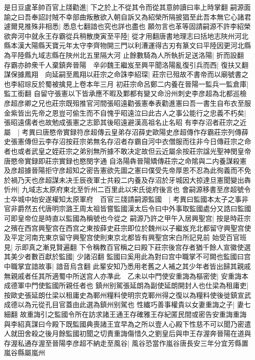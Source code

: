 是日豆盧革帥百官上牋勸進|{
	下之於上不從其令而從其意帥讀曰率上時掌翻}
嗣源面諭之曰吾奉詔討賊不幸部曲叛散欲入朝自訴又為紹榮所隔披猖至此吾本無它心諸君遽爾見推殊非相悉|{
	悉息七翻諳也究也詳也盡也}
願勿言也革等固請嗣源不許李紹榮欲奔河中就永王存霸從兵稍散庚寅至平陸|{
	從才用翻唐書地理志曰括地志陜州河北縣本漢大陽縣天寶元年太守李齊物開三門以利漕運得古刃有篆文曰平陸因更河北縣為平陸縣九域志縣在陜州北五里隔大河}
止餘數騎為人所執折足送洛陽|{
	折而設翻}
存霸亦帥衆千人棄鎮奔晉陽　辛卯魏王繼岌至興平聞洛陽亂復引兵而西|{
	復扶又翻}
謀保據鳳翔　向延嗣至鳳翔以莊宗之命誅李紹琛|{
	莊宗已殂故不書帝而以廟號書之也李紹琮反於蜀被擒見上卷本年三月}
初莊宗命呂鄭二内養在晉陽一監兵一監倉庫|{
	監工銜翻}
自留守張憲以下皆承應不暇及鄴都有變又命汾州刺史李彦超為北都巡檢彦超彦卿之兄也莊宗既殂推官河間張昭遠勸張憲奉表勸進憲曰吾一書生自布衣至服金紫皆出先帝之恩豈可偷生而不自愧乎昭遠泣曰此古人之事公能行之忠義不朽矣|{
	張昭遠儒者也故勉成張憲之志節其後昭遠避漢高祖名止名昭}
有李存沼者莊宗之近屬　|{
	考異曰唐愍帝實録符彦超傳云皇弟存沼薛史歐陽史彦超傳作存霸莊宗列傳薛史張憲傳但云李存沼按莊宗弟無名存沼者存霸自河中衣僧服而往非今日傳莊宗之命者也或者武皇之姪莊宗之弟别無所據不敢决定故但云近屬余按莊宗諡光聖神閔皇帝唐愍帝實録即莊宗實録也愍閔字通}
自洛陽犇晉陽矯傳莊宗之命隂與二内養謀殺憲及彦超據晉陽拒守彦超知之密告憲欲先圖之憲曰僕受先帝厚恩不忍為此徇義而不免於禍乃天也彦超謀未决壬辰夜軍士共殺二内養及存沼於牙城因大掠達旦憲聞變出犇忻州|{
	九域志太原府東北至忻州二百里此以宋氏徙府後言也}
會嗣源移書至彦超號令士卒城中始安遂權知太原軍府　百官三牋請嗣源監國　|{
	考異曰監國本太子之事非官非爵然五代唐明宗潞王周太祖皆嘗監國漢太后令曰中外事取監國處分又誥曰監國可即皇帝位是時直以監國為稱號也今從之}
嗣源乃許之甲午入居興聖宫|{
	按是時莊宗之殯在西宫興聖宫在西宫之東按薛史莊宗即位於魏州以子繼岌充北都留守興聖宫使及平定河南充東京留守興聖宫使則東京北都皆有興聖宫宋白所記見前}
始受百官班見|{
	示即真之漸見賢遍翻}
下令稱教百官稱之曰殿下莊宗後宫存者猶千餘人宣徽使選其美少者數百獻於監國|{
	少諸沼翻}
監國曰奚用此為對曰宫中職掌不可闕也監國曰宫中職掌宜諳故事|{
	諳音烏含翻}
此輩安知乃悉用老舊之人補之其少年者皆出歸其親戚無親戚者任其所適蜀中所送宫人亦準此　乙未以中門使安重誨為樞密使|{
	安重誨本成德軍中門使監國所親任者也}
鎮州别駕張延朗為副使延朗開封人也仕梁為租庸吏|{
	按歐史張延朗仕梁以租庸史為鄆州糧料使明宗克鄆州得之復以為糧料使後徙鎮宣武成德以為元從孔目官蓋由此選為鎮州别駕也}
性纎巧善事權貴以女妻重誨之子|{
	妻七細翻}
故重誨引之監國令所在訪求諸王通王存確雅王存紀匿民間或密告安重誨重誨與李紹真謀曰今殿下既監國典喪諸王宜早為之所以壹人心殿下性慈不可以聞乃密遣人就田舍殺之後月餘監國初聞之切責重誨傷惜久之劉皇后與申王存渥奔晉陽在道與存渥私通存渥至晉陽李彦超不納走至風谷|{
	風谷恐當作嵐谷唐長安三年分宜芳縣置嵐谷縣屬嵐州}
